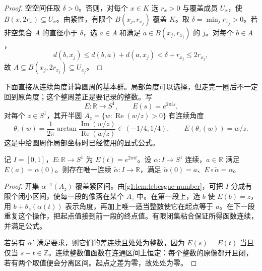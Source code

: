 \begin{proof}
	空空间任取 \(\delta>0\)。否则，对每个 \(x\in K\) 选 \(r_x>0\) 与覆盖成员 \(U_x\)，使 \(B(x,2r_x)\subseteq U_x\)。由紧性，有限个 \(B(x_j,r_{x_j})\) 覆盖 \(K\)。取 \(\delta=\min_jr_{x_j}>0\)。若非空集合 \(A\) 的直径小于 \(\delta\)，选 \(a\in A\) 和满足 \(a\in B(x_j,r_{x_j})\) 的 \(j\)。对每个 \(b\in A\)，
	\[
		d(b,x_j)\le d(b,a)+d(a,x_j)<\delta+r_{x_j}\le2r_{x_j},
	\]
	故 \(A\subseteq B(x_j,2r_{x_j})\subseteq U_{x_j}\)。
\end{proof}

下面直接从连续角度计算圆周的基本群。局部角度可以选择，但走完一圈后不一定回到原角度；这个整周差正是要记录的整数。写
\[
	E:\mathbb R\longrightarrow S^1,\qquad E(s)=e^{2\pi is}.
\]
对每个 \(z\in S^1\)，其开半圆 \(A_z=\{w:\operatorname{Re}(w/z)>0\}\) 有连续角度
\[
	\theta_z(w)=\frac{1}{2\pi}\arctan\frac{\operatorname{Im}(w/z)}{\operatorname{Re}(w/z)}
	\in(-1/4,1/4),\qquad E(\theta_z(w))=w/z.
\]
这是中给圆周作局部坐标时已经使用的显式公式。

\begin{lemma}\label{g1:lem:circle-angle-lift}
	记 \(I=[0,1]\)，\(E:\mathbb R\to S^1\) 为 \(E(t)=e^{2\pi it}\)。设 \(\alpha:I\rightarrow S^1\) 连续，\(a\in\mathbb R\) 满足 \(E(a)=\alpha(0)\)。则存在唯一连续 \(\widetilde\alpha:I\rightarrow\mathbb R\)，满足 \(\widetilde\alpha(0)=a\)、\(E\circ\widetilde\alpha=\alpha\)。
\end{lemma}
\begin{proof}
	开集 \(\alpha^{-1}(A_z)\) 覆盖紧区间。由\cref{g1:lem:lebesgue-number}，可把 \(I\) 分成有限个闭小区间，使每一段的像落在某个 \(A_z\) 中。在第一段上，选 \(b\) 使 \(E(b)=z\)，用 \(b+\theta_z(\alpha(t))\) 表示角度，再加上唯一适当整数使它在起点等于 \(a\)。在下一段重复这个操作，把起点值接到前一段的终点值。有限闭集粘合保证所得函数连续，并满足公式。

	若另有 \(\widetilde\alpha'\) 满足要求，则它们的差连续且处处为整数，因为 \(E(s)=E(t)\) 当且仅当 \(s-t\in\mathbb Z\)。连续整数值函数在连通区间上恒定：每个整数的原像都开且闭，若有两个取值便会分离区间。起点之差为零，故处处为零。
\end{proof}

